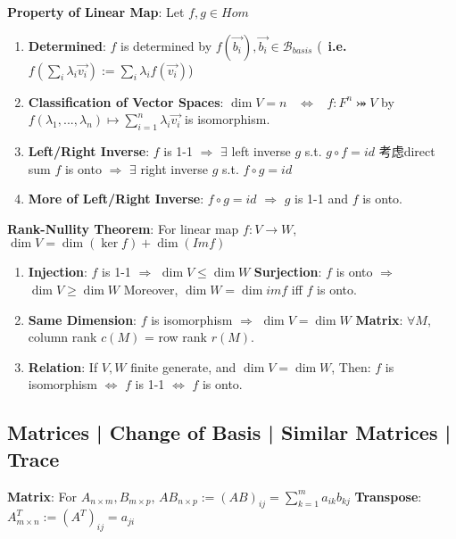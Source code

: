 \documentclass[9pt]{article}
\begin{document}
\textbf{Property of Linear Map}: Let $f,g\in Hom$

\begin{enumerate}[itemsep=-2pt, topsep=-2pt]
    \item \textbf{Determined}: $f$ is determined by $f(\vec{b_i}),\vec{b_i}\in \mathcal{B}_{basis}$ {\footnotesize (\star \ \textbf{i.e.} $f(\sum_{i}\lambda_i\vec{v_i}):=\sum_{i}\lambda_if(\vec{v_i})$)}
    \item \textbf{Classification of Vector Spaces}: $\dim V=n$ \ $\Leftrightarrow$ \ $f:F^n\bij V$ by $f(\lambda_1,...,\lambda_n)\mapsto\sum_{i=1}^{n}\lambda_i\vec{v_i}$ is isomorphism.
    \item \textbf{Left/Right Inverse}: $f$ is 1-1 $\Rightarrow$ $\exists$ left inverse $g$ s.t. $g\circ f=id$ {\scriptsize 考虑direct sum} \quad \quad $f$ is onto $\Rightarrow$ $\exists$ right inverse $g$ s.t. $f\circ g=id$
    \item \np\textbf{More of Left/Right Inverse}: $f\circ g=id$ $\Rightarrow$ $g$ is 1-1 and $f$ is onto. 
\end{enumerate}

\textbf{Rank-Nullity Theorem}: For linear map $f:V\to W$, $\dim V=\dim(\ker f)+\dim(Im f)$ \quad \quad {}

\begin{enumerate}[itemsep=-2pt, topsep=-2pt]
    \item \textbf{Injection}: $f$ is 1-1 $\Rightarrow$ $\dim V \leq \dim W$ \quad \textbf{Surjection}: $f$ is onto $\Rightarrow$ $\dim V \geq \dim W$ \quad Moreover, $\dim W=\dim imf$ iff $f$ is onto.
    \item \textbf{Same Dimension}: {\small $f$ is isomorphism $\Rightarrow$ $\dim V=\dim W$} \quad \quad \quad \textbf{Matrix}: $\forall M$, column rank $c(M)$ = row rank $r(M)$.
    \item \textbf{Relation}: {\small If $V,W$ finite generate, and $\dim V=\dim W$, \quad Then: $f$ is isomorphism $\Leftrightarrow$ $f$ is 1-1 $\Leftrightarrow$ $f$ is onto.}
\end{enumerate}


\subsection{Matrices | Change of Basis | Similar Matrices | Trace} %

\textbf{Matrix}: For $A_{n\times m},B_{m\times p}$, $AB_{n\times p}:=(AB)_{ij}=\sum_{k=1}^{m}a_{ik}b_{kj}$ \quad \textbf{Transpose}: $A^T_{m\times n}:=(A^T)_{ij}=a_{ji}$
\end{document}
